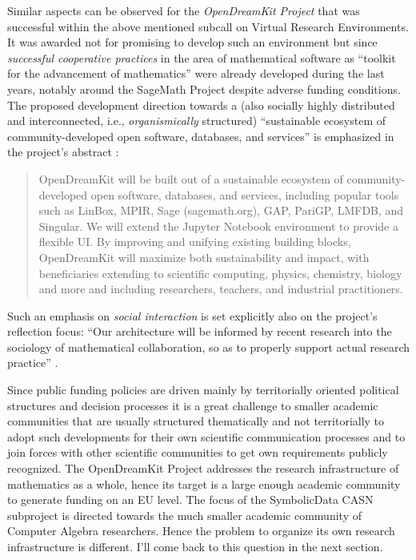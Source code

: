 \documentclass{llncs}
\newcommand{\SD}{{\sc Symbo\-lic\-Data}}
\begin{document}
Similar aspects can be observed for the \emph{OpenDreamKit Project} \cite{odk}
that was successful within the above mentioned subcall on Virtual Research
Environments.  It was awarded not for promising to develop such an environment
but since \emph{successful cooperative practices} in the area of mathematical
software as ``toolkit for the advancement of mathematics'' were already
developed during the last years, notably around the SageMath Project
\cite{sagemath} despite adverse funding conditions.  The proposed development
direction towards a (also socially highly distributed and interconnected, i.e.,
\emph{organismically} structured) ``sustainable ecosystem of
community-developed open software, databases, and services'' is emphasized in
the project's abstract \cite{odk}:
\begin{quote}
  OpenDreamKit will be built out of a sustainable ecosystem of
  community-developed open software, databases, and services, including popular
  tools such as LinBox, MPIR, Sage (sagemath.org), GAP, PariGP, LMFDB, and
  Singular. We will extend the Jupyter Notebook environment to provide a
  flexible UI. By improving and unifying existing building blocks, OpenDreamKit
  will maximize both sustainability and impact, with beneficiaries extending to
  scientific computing, physics, chemistry, biology and more and including
  researchers, teachers, and industrial practitioners.
\end{quote}
Such an emphasis on \emph{social interaction} is set explicitly also on the
project's reflection focus: ``Our architecture will be informed by recent
research into the sociology of mathematical collaboration, so as to properly
support actual research practice'' \cite{odk}.
\medskip

Since public funding policies are driven mainly by territorially oriented
political structures and decision processes it is a great challenge to smaller
academic communities that are usually structured thematically and not
territorially to adopt such developments for their own scientific communication
processes and to join forces with other scientific communities to get own
requirements publicly recognized.  The OpenDreamKit Project addresses the
research infrastructure of mathematics as a whole, hence its target is a large
enough academic community to generate funding on an EU level. The focus of the
{\SD} CASN subproject is directed towards the much smaller academic community
of Computer Algebra researchers.  Hence the problem to organize its own
research infrastructure is different. I'll come back to this question in the
next section.  
\end{document}
